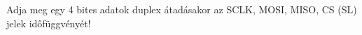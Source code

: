 \begin{example}

Adja meg egy 4 bites adatok duplex átadásakor az SCLK, MOSI, MISO, CS (SL) jelek időfüggvényét!

\tcbline
\vspace{1mm}

\solution

\end{example}